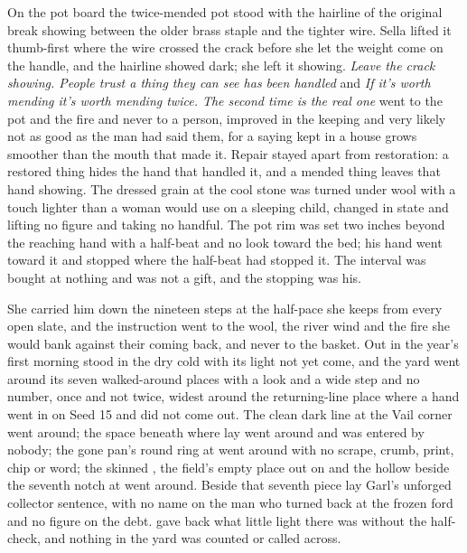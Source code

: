 On the pot board the twice-mended pot stood with the hairline of the original break showing between the older brass staple and the tighter wire. Sella lifted it thumb-first where the wire crossed the crack before she let the weight come on the handle, and the hairline showed dark; she left it showing. \emph{Leave the crack showing. People trust a thing they can see has been handled} and \emph{If it's worth mending it's worth mending twice. The second time is the real one} went to the pot and the fire and never to a person, improved in the keeping and very likely not as good as the man had said them, for a saying kept in a house grows smoother than the mouth that made it. Repair stayed apart from restoration: a restored thing hides the hand that handled it, and a mended thing leaves that hand showing. The dressed grain at the cool stone was turned under wool with a touch lighter than a woman would use on a sleeping child, changed in state and lifting no figure and taking no handful. The pot rim was set two inches beyond the reaching hand with a half-beat and no look toward the bed; his hand went toward it and stopped where the half-beat had stopped it. The interval was bought at nothing and was not a gift, and the stopping was his.

\scenebreak

She carried him down the nineteen steps at the half-pace she keeps from every open slate, and the instruction went to the wool, the river wind and the fire she would bank against their coming back, and never to the basket. Out in  the year's first morning stood in the dry cold with its light not yet come, and the yard went around its seven walked-around places with a look and a wide step and no number, once and not twice, widest around the returning-line place where a hand went in on Seed 15 and did not come out. The clean dark line at the Vail corner went around; the space beneath  where  lay went around and was entered by nobody; the gone pan's round ring at  went around with no scrape, crumb, print, chip or word; the skinned , the field's empty place out on  and the hollow beside the seventh notch at  went around. Beside that seventh piece lay Garl's unforged collector sentence, with no name on the man who turned back at the frozen ford and no figure on the debt.  gave back what little light there was without the half-check, and nothing in the yard was counted or called across.

